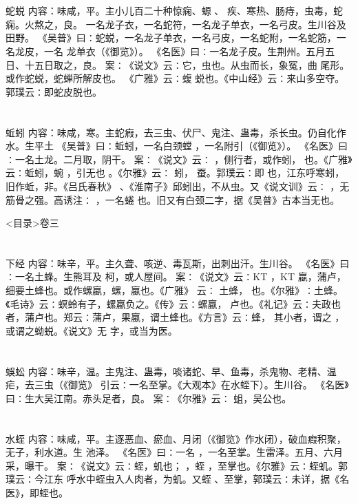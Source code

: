 \documentclass[12pt,UTF8]{ctexbook}
\begin{document}
\chapter{}蛇蜕
内容：味咸，平。主小儿百二十种惊痫、螈 、 疾、寒热、肠痔，虫毒，蛇痫。火熬之，良。 
一名龙子衣，一名蛇符，一名龙子单衣，一名弓皮。生川谷及田野。 
《吴普》曰∶蛇蜕，一名龙子单衣，一名弓皮，一名蛇附，一名蛇筋，一名龙皮，一名 
龙单衣（《御览》）。 
《名医》曰∶一名龙子皮。生荆州。五月五日、十五日取之，良。 
案∶《说文》云∶它，虫也。从虫而长，象冤，曲 尾形。或作蛇蜕，蛇蝉所解皮也。 
《广雅》云∶蝮 蜕也。《中山经》云∶来山多空夺。郭璞云∶即蛇皮脱也。 


\chapter{}蚯蚓
内容：味咸，寒。主蛇瘕，去三虫、伏尸、鬼注、蛊毒，杀长虫。仍自化作水。生平土 
《吴普》曰∶蚯蚓，一名白颈螳 ，一名附引（《御览》）。 
《名医》曰∶一名土龙。二月取，阴干。 
案∶《说文》云∶ ，侧行者，或作蚓， 也。《广雅》云∶蚯蚓，蜿 ，引无也 
。《尔雅》云∶ 蚓， 蚕。郭璞云∶即 也，江东呼寒蚓，旧作蚯，非。《吕氏春秋》 
、《淮南子》邱蚓出，不从虫。又《说文训》云∶ ，无筋骨之强。高诱注∶ ，一名蜷 
也。旧又有白颈二字，据《吴普》古本当无也。 

<目录>卷三
\chapter{}下经
内容：味辛，平。主久聋、咳逆、毒瓦斯，出刺出汗。生川谷。 
《名医》曰∶一名土蜂。生熊耳及 柯，或人屋间。 
案∶《说文》云∶KT ，KT 蠃，蒲卢，细要土蜂也。或作螺蠃，螺，蠃也。《广雅》 
云∶ 
土蜂， 也。《尔雅》∶土蜂。《毛诗》云∶螟蛉有子，螺蠃负之。《传》云∶螺蠃， 
卢也。《礼记》云∶夫政也者，蒲卢也。郑云∶蒲卢，果蠃，谓土蜂也。《方言》云∶蜂， 
其小者，谓之 ，或谓之蚴蜕。《说文》无 字，或当为医。 


\chapter{}蜈蚣
内容：味辛，温。主鬼注、蛊毒，啖诸蛇、早、鱼毒，杀鬼物、老精、温疟，去三虫（《御览》 
引云∶一名至掌。《大观本》在水蛭下）。生川谷。 
《名医》曰∶生大吴江南。赤头足者，良。 
案∶《尔雅》云∶ 蛆，吴公也。 


\chapter{}水蛭
内容：味咸，平。主逐恶血、瘀血、月闭（《御览》作水闭），破血瘕积聚，无子，利水道。生 
池泽。 
《名医》曰∶一名 ，一名至掌。生雷泽。五月、六月采，曝干。 
案∶《说文》云∶蛭，虮也； ，蛭 ，至掌也。《尔雅》云∶蛭虮。郭璞云∶今江东 
呼水中蛭虫入人肉者，为虮。又蛭 、至掌，郭璞云∶未详，据《名医》，即蛭也。 
\end{document}
